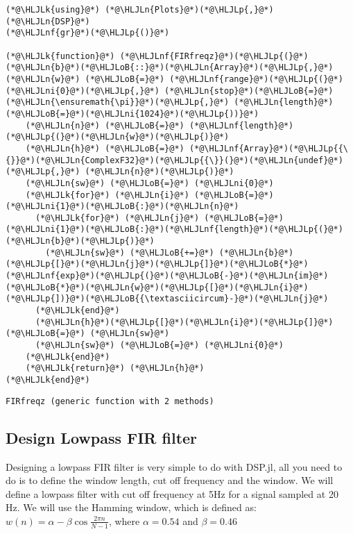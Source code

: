 \documentclass[12pt,a4paper]{article}
\newcommand{\HLJLk}[1]{\textcolor[RGB]{148,91,176}{\textbf{#1}}}
\newcommand{\HLJLn}[1]{#1}
\newcommand{\HLJLnf}[1]{\textcolor[RGB]{66,102,213}{#1}}
\newcommand{\HLJLni}[1]{\textcolor[RGB]{59,151,46}{#1}}
\newcommand{\HLJLoB}[1]{\textcolor[RGB]{102,102,102}{\textbf{#1}}}
\newcommand{\HLJLp}[1]{#1}
\begin{document}
\begin{lstlisting}
(*@\HLJLk{using}@*) (*@\HLJLn{Plots}@*)(*@\HLJLp{,}@*) (*@\HLJLn{DSP}@*)
(*@\HLJLnf{gr}@*)(*@\HLJLp{()}@*)

(*@\HLJLk{function}@*) (*@\HLJLnf{FIRfreqz}@*)(*@\HLJLp{(}@*)(*@\HLJLn{b}@*)(*@\HLJLoB{::}@*)(*@\HLJLn{Array}@*)(*@\HLJLp{,}@*) (*@\HLJLn{w}@*) (*@\HLJLoB{=}@*) (*@\HLJLnf{range}@*)(*@\HLJLp{(}@*)(*@\HLJLni{0}@*)(*@\HLJLp{,}@*) (*@\HLJLn{stop}@*)(*@\HLJLoB{=}@*)(*@\HLJLn{\ensuremath{\pi}}@*)(*@\HLJLp{,}@*) (*@\HLJLn{length}@*)(*@\HLJLoB{=}@*)(*@\HLJLni{1024}@*)(*@\HLJLp{))}@*)
    (*@\HLJLn{n}@*) (*@\HLJLoB{=}@*) (*@\HLJLnf{length}@*)(*@\HLJLp{(}@*)(*@\HLJLn{w}@*)(*@\HLJLp{)}@*)
    (*@\HLJLn{h}@*) (*@\HLJLoB{=}@*) (*@\HLJLnf{Array}@*)(*@\HLJLp{{\{}}@*)(*@\HLJLn{ComplexF32}@*)(*@\HLJLp{{\}}(}@*)(*@\HLJLn{undef}@*)(*@\HLJLp{,}@*) (*@\HLJLn{n}@*)(*@\HLJLp{)}@*)
    (*@\HLJLn{sw}@*) (*@\HLJLoB{=}@*) (*@\HLJLni{0}@*)
    (*@\HLJLk{for}@*) (*@\HLJLn{i}@*) (*@\HLJLoB{=}@*) (*@\HLJLni{1}@*)(*@\HLJLoB{:}@*)(*@\HLJLn{n}@*)
      (*@\HLJLk{for}@*) (*@\HLJLn{j}@*) (*@\HLJLoB{=}@*) (*@\HLJLni{1}@*)(*@\HLJLoB{:}@*)(*@\HLJLnf{length}@*)(*@\HLJLp{(}@*)(*@\HLJLn{b}@*)(*@\HLJLp{)}@*)
        (*@\HLJLn{sw}@*) (*@\HLJLoB{+=}@*) (*@\HLJLn{b}@*)(*@\HLJLp{[}@*)(*@\HLJLn{j}@*)(*@\HLJLp{]}@*)(*@\HLJLoB{*}@*)(*@\HLJLnf{exp}@*)(*@\HLJLp{(}@*)(*@\HLJLoB{-}@*)(*@\HLJLn{im}@*)(*@\HLJLoB{*}@*)(*@\HLJLn{w}@*)(*@\HLJLp{[}@*)(*@\HLJLn{i}@*)(*@\HLJLp{])}@*)(*@\HLJLoB{{\textasciicircum}-}@*)(*@\HLJLn{j}@*)
      (*@\HLJLk{end}@*)
      (*@\HLJLn{h}@*)(*@\HLJLp{[}@*)(*@\HLJLn{i}@*)(*@\HLJLp{]}@*) (*@\HLJLoB{=}@*) (*@\HLJLn{sw}@*)
      (*@\HLJLn{sw}@*) (*@\HLJLoB{=}@*) (*@\HLJLni{0}@*)
    (*@\HLJLk{end}@*)
    (*@\HLJLk{return}@*) (*@\HLJLn{h}@*)
(*@\HLJLk{end}@*)
\end{lstlisting}

\begin{lstlisting}
FIRfreqz (generic function with 2 methods)
\end{lstlisting}


\subsection{Design Lowpass FIR filter}

Designing a lowpass FIR filter is very simple to do with DSP.jl, all you need to do is to define the window length, cut off frequency and the window. We will define a lowpass filter with cut off frequency at 5Hz for a signal sampled at 20 Hz. We will use the Hamming window, which is defined as: $w(n) = \alpha - \beta\cos\frac{2\pi n}{N-1}$, where $\alpha=0.54$ and $\beta=0.46$
\end{document}
